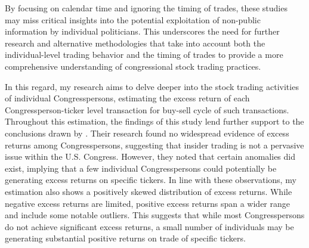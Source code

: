 \documentclass[15pt,letterpaper]{article}
\begin{document}
By focusing on calendar time and ignoring the timing of trades, these studies may miss critical insights into the potential exploitation of non-public information by individual politicians. This underscores the need for further research and alternative methodologies that take into account both the individual-level trading behavior and the timing of trades to provide a more comprehensive understanding of congressional stock trading practices.

In this regard, my research aims to delve deeper into the stock trading activities of individual Congresspersons, estimating the excess return of each Congressperson-ticker level transaction for buy-sell cycle of such transactions. 
Throughout this estimation, the findings of this study lend further support to the conclusions drawn by \cite{eg13}. Their research found no widespread evidence of excess returns among Congresspersons, suggesting that insider trading is not a pervasive issue within the U.S. Congress. However, they noted that certain anomalies did exist, implying that a few individual Congresspersons could potentially be generating excess returns on specific tickers.
In line with these observations, my estimation also shows a positively skewed distribution of excess returns. While negative excess returns are limited, positive excess returns span a wider range and include some notable outliers. 
This suggests that while most Congresspersons do not achieve significant excess returns, a small number of individuals may be generating substantial positive returns on trade of specific tickers. 
\end{document}
